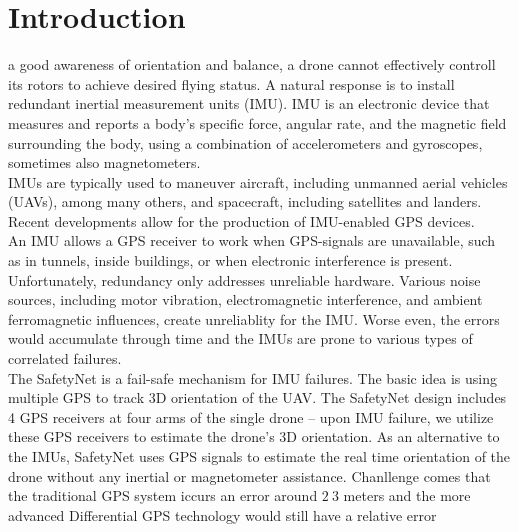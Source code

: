 \documentclass[journal,onecolumn]{IEEEtran}
\begin{document}
\section{Introduction}
%
%
%
%
 a good awareness of orientation and balance, a drone
cannot effectively controll its rotors to achieve desired flying status.
A natural response is to install redundant inertial measurement units (IMU).
IMU is an electronic device that measures and reports a body's specific force,
angular rate, and the magnetic field surrounding the body, using a combination
of accelerometers and gyroscopes, sometimes also magnetometers.\\
IMUs are typically used to maneuver aircraft, including unmanned aerial vehicles
(UAVs), among many others, and spacecraft, including satellites and landers.
Recent developments allow for the production of IMU-enabled GPS devices.\\
An IMU allows a GPS receiver to work when GPS-signals are unavailable,
such as in tunnels, inside buildings, or when electronic interference is present.
Unfortunately, redundancy only addresses unreliable hardware.
Various noise sources, including motor vibration, electromagnetic interference,
and ambient ferromagnetic influences, create unreliablity for the IMU. Worse even,
the errors would accumulate through time and the IMUs are prone to various types of
correlated failures.\\
The SafetyNet is a fail-safe mechanism for IMU failures. The basic idea is using
multiple GPS to track 3D orientation of the UAV. The SafetyNet design includes 4 GPS
receivers at four arms of the single drone – upon IMU failure, we utilize these
GPS receivers to estimate the drone’s 3D orientation.
As an alternative to the IMUs, SafetyNet uses GPS signals to estimate the real time
orientation of the drone without any inertial or magnetometer assistance.
Chanllenge comes that the traditional GPS system iccurs an error around $2~3$ meters
and the more advanced Differential GPS technology would still have a relative error
\end{document}
